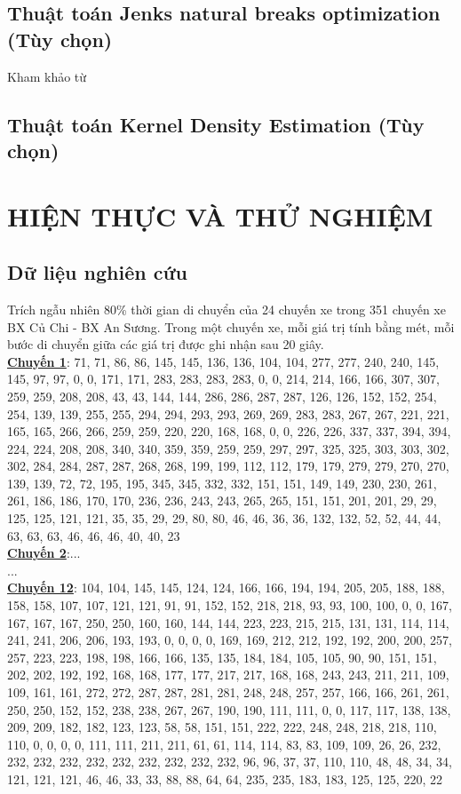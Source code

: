 \documentclass[a4paper, 13pt]{report}
\begin{document}
\section{Thuật toán Jenks natural breaks optimization (Tùy chọn)}
Kham khảo từ \cite{JNBO}
\section{Thuật toán Kernel Density Estimation (Tùy chọn)}
\chapter{HIỆN THỰC VÀ THỬ NGHIỆM}
\section{Dữ liệu nghiên cứu}
Trích ngẫu nhiên 80\% thời gian di chuyển của 24 chuyến xe trong 351 chuyến xe BX Củ Chi - BX An Sương. Trong một chuyến xe, mỗi giá trị tính bằng mét, mỗi bước di chuyển giữa các giá trị được ghi nhận sau 20 giây.\\
\textbf{\underline{Chuyến 1}}: 
71, 71, 86, 86, 145, 145, 136, 136, 104, 104, 277, 277, 240, 240, 145, 145, 97, 97, 0, 0, 171, 171, 283, 283, 283, 283, 0, 0, 214, 214, 166, 166, 307, 307, 259, 259, 208, 208, 43, 43, 144, 144, 286, 286, 287, 287, 126, 126, 152, 152, 254, 254, 139, 139, 255, 255, 294, 294, 293, 293, 269, 269, 283, 283, 267, 267, 221, 221, 165, 165, 266, 266, 259, 259, 220, 220, 168, 168, 0, 0, 226, 226, 337, 337, 394, 394, 224, 224, 208, 208, 340, 340, 359, 359, 259, 259, 297, 297, 325, 325, 303, 303, 302, 302, 284, 284, 287, 287, 268, 268, 199, 199, 112, 112, 179, 179, 279, 279, 270, 270, 139, 139, 72, 72, 195, 195, 345, 345, 332, 332, 151, 151, 149, 149, 230, 230, 261, 261, 186, 186, 170, 170, 236, 236, 243, 243, 265, 265, 151, 151, 201, 201, 29, 29, 125, 125, 121, 121, 35, 35, 29, 29, 80, 80, 46, 46, 36, 36, 132, 132, 52, 52, 44, 44, 63, 63, 63, 46, 46, 46, 40, 40, 23\\
\textbf{\underline{Chuyến 2}}:...\\
...\\
\textbf{\underline{Chuyến 12}}: 104, 104, 145, 145, 124, 124, 166, 166, 194, 194, 205, 205, 188, 188, 158, 158, 107, 107, 121, 121, 91, 91, 152, 152, 218, 218, 93, 93, 100, 100, 0, 0, 167, 167, 167, 167, 250, 250, 160, 160, 144, 144, 223, 223, 215, 215, 131, 131, 114, 114, 241, 241, 206, 206, 193, 193, 0, 0, 0, 0, 169, 169, 212, 212, 192, 192, 200, 200, 257, 257, 223, 223, 198, 198, 166, 166, 135, 135, 184, 184, 105, 105, 90, 90, 151, 151, 202, 202, 192, 192, 168, 168, 177, 177, 217, 217, 168, 168, 243, 243, 211, 211, 109, 109, 161, 161, 272, 272, 287, 287, 281, 281, 248, 248, 257, 257, 166, 166, 261, 261, 250, 250, 152, 152, 238, 238, 267, 267, 190, 190, 111, 111, 0, 0, 117, 117, 138, 138, 209, 209, 182, 182, 123, 123, 58, 58, 151, 151, 222, 222, 248, 248, 218, 218, 110, 110, 0, 0, 0, 0, 111, 111, 211, 211, 61, 61, 114, 114, 83, 83, 109, 109, 26, 26, 232, 232, 232, 232, 232, 232, 232, 232, 232, 232, 96, 96, 37, 37, 110, 110, 48, 48, 34, 34, 121, 121, 121, 46, 46, 33, 33, 88, 88, 64, 64, 235, 235, 183, 183, 125, 125, 220, 22\\
\end{document}
